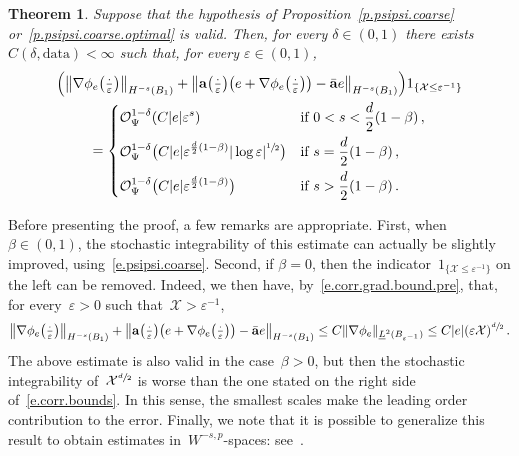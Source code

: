 \documentclass[11pt]{article} %
\numberwithin{equation}{section}
\newtheorem{theorem}{Theorem}[section]
\theoremstyle{definition}
\let\originalleft\left
\let\originalright\right
\renewcommand{\left}{\mathopen{}\mathclose\bgroup\originalleft}
\renewcommand{\right}{\aftergroup\egroup\originalright}
\newcommand{\eps}{\varepsilon}
\newcommand{\ep}{\eps}
\renewcommand{\a}{\mathbf{a}}
\newcommand{\ahom}{\bar{\a}}
\newcommand{\X}{\mathcal{X}}
\renewcommand{\O}{\mathcal{O}}
\newcommand{\indc}{1}
\newcommand{\data}{\mathrm{data}}
\begin{document}
\begin{theorem}
\label{t.corr.optimal}
Suppose that the hypothesis of Proposition~\ref{p.psipsi.coarse} or~\ref{p.psipsi.coarse.optimal} is valid. Then, for every $\delta \in (0,1)$ there exists $C(\delta,\data)<\infty$ such that, for every $\ep \in (0,1)$, 
\begin{multline}
\label{e.corr.bounds}
\Big( \big\| \nabla \phi_e\bigl( \tfrac{\cdot}{\ep} \bigr)  \bigr\|_{H^{-s}(B_1)}  + \big\| \a\bigl( \tfrac{\cdot}{\ep} \bigr)\bigl( e + \nabla \phi_e\bigl( \tfrac{\cdot}{\ep} \bigr) \bigr) - \ahom e \bigr\|_{H^{-s}(B_1)} \Big)\indc_{\{ \X \leq \ep^{-1} \}} 
\\
= 
\left\{
\begin{aligned}
& \O_{\Psi}^{1-\delta} (C |e| \ep^s) & \mbox{if} & \ 0 < s < \frac{d}{2}(1-\beta)\,,\\
&\O_{\Psi}^{1-\delta}  \bigl( C  |e| \ep^{\frac d2(1-\beta)} | \log \ep|^{\sfrac12} \bigr) & \mbox{if} & \ s = \frac{d}{2}(1-\beta) \,, \\
&\O_{\Psi}^{1-\delta} \bigl( C |e| \ep^{\frac d2(1-\beta)} \bigr) & \mbox{if} & \ s > \frac{d}{2}(1-\beta) \,.
\end{aligned}
\right.
\end{multline}
\end{theorem}
Before presenting the proof, a few remarks are appropriate. First, when $\beta \in (0,1)$, the stochastic integrability of this estimate can actually be slightly improved, using~\eqref{e.psipsi.coarse}. Second, if $\beta = 0$, then the indicator~$\indc_{\{ \X \leq \ep^{-1} \}}$ on the left can be removed. Indeed, we then have, by~\eqref{e.corr.grad.bound.pre}, that, for every~$\ep>0$ such that~$\X > \ep^{-1}$, 
\begin{align*}  
\big\| \nabla \phi_e\bigl( \tfrac{\cdot}{\ep} \bigr)  \bigr\|_{H^{-s}(B_1)}  + \big\| \a\bigl( \tfrac{\cdot}{\ep} \bigr)\bigl( e + \nabla \phi_e\bigl( \tfrac{\cdot}{\ep} \bigr) \bigr) - \ahom e \bigr\|_{H^{-s}(B_1)}
\leq 
C \| \nabla \phi_e\|_{\underline{L}^2(B_{\ep^{-1}})} 
\leq 
C |e| (\ep \X)^{\sfrac d2}
\,.
\end{align*}
The above estimate is also valid in the case~$\beta >0$, but then the stochastic integrability of~$\X^{\sfrac d2}$ is worse than the one stated on the right side of~\eqref{e.corr.bounds}. In this sense, the smallest scales make the leading order contribution to the error. Finally, we note that it is possible to generalize this result to obtain estimates in~$W^{-s,p}$-spaces: see~\cite[Theorem 4.24]{AKMBook}.
\end{document}
